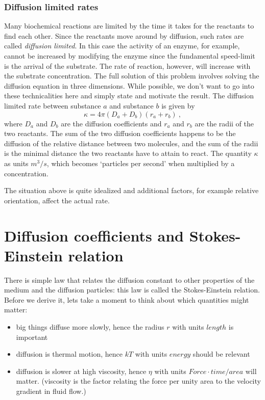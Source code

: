 \subsubsection*{Diffusion limited rates}
Many biochemical reactions are limited by the time it takes for the reactants to find each other.
Since the reactants move around by diffusion, such rates are called \emph{diffusion limited}.
In this case the activity of an enzyme, for example, cannot be increased by modifying the enzyme since the fundamental speed-limit is the arrival of the substrate.
The rate of reaction, however, will increase with the substrate concentration.
The full solution of this problem involves solving the diffusion equation in three dimensions.
While possible, we don't want to go into these technicalities here and simply state and motivate the result.
The diffusion limited rate between substance $a$ and substance $b$ is given by
\begin{equation}
	\label{eq:diffusion_limit}
	\kappa = 4\pi (D_a+D_b)(r_a+r_b) \ ,
\end{equation}
where $D_a$ and $D_b$ are the diffusion coefficients and $r_a$ and $r_b$ are the radii of the two reactants.
The sum of the two diffusion coefficients happens to be the diffusion of the relative distance between two molecules, and the sum of the radii is the minimal distance the two reactants have to attain to react.
The quantity $\kappa$ as units $m^3/s$, which becomes `particles per second' when multiplied by a concentration.

The situation above is quite idealized and additional factors, for example relative orientation, affect the actual rate.


\section{Diffusion coefficients and Stokes-Einstein relation}
There is simple law that relates the diffusion constant to other properties of the medium and the diffusion particles: this law is called the Stokes-Einstein relation.
Before we derive it, lets take a moment to think about which quantities might matter:
\begin{itemize}
  \item big things diffuse more slowly, hence the radius $r$ with units $length$ is important
  \item diffusion is thermal motion, hence $kT$ with units $energy$ should be relevant
  \item diffusion is slower at high viscosity, hence $\eta$ with units $Force\cdot time/area$ will matter.
  	(viscosity is the factor relating the force per unity area to the velocity gradient in fluid flow.)
\end{itemize}

